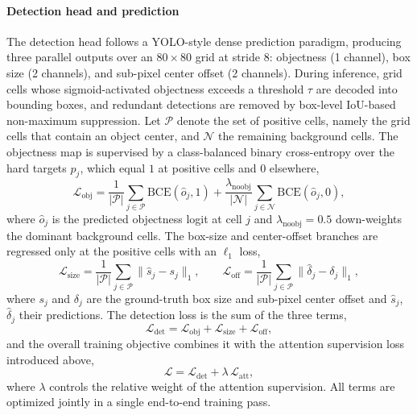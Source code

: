 \documentclass[lettersize,journal]{IEEEtran}
\begin{document}
\paragraph{Detection head and prediction}
The detection head follows a YOLO-style dense prediction paradigm, 
producing three parallel outputs over an $80\times80$ grid at stride 8: 
objectness (1 channel), box size (2 channels), and sub-pixel center offset (2 channels). 
During inference, grid cells whose sigmoid-activated objectness exceeds a threshold $\tau$ are decoded into bounding boxes, 
and redundant detections are removed by box-level IoU-based non-maximum suppression. 
Let $\mathcal{P}$ denote the set of positive cells, namely the grid cells that contain an object center, and $\mathcal{N}$ the remaining background cells.
The objectness map is supervised by a class-balanced binary cross-entropy over the hard targets $p_j$, which equal $1$ at positive cells and $0$ elsewhere,
\begin{equation}
\mathcal{L}_{\mathrm{obj}} = \frac{1}{|\mathcal{P}|}\sum_{j\in\mathcal{P}} \mathrm{BCE}(\hat{o}_j, 1)
+ \frac{\lambda_{\mathrm{noobj}}}{|\mathcal{N}|}\sum_{j\in\mathcal{N}} \mathrm{BCE}(\hat{o}_j, 0),
\end{equation}
where $\hat{o}_j$ is the predicted objectness logit at cell $j$ and $\lambda_{\mathrm{noobj}}=0.5$ down-weights the dominant background cells.
The box-size and center-offset branches are regressed only at the positive cells with an $\ell_1$ loss,
\begin{equation}
\mathcal{L}_{\mathrm{size}} = \frac{1}{|\mathcal{P}|}\sum_{j\in\mathcal{P}} \lVert \hat{s}_j - s_j \rVert_1,
\qquad
\mathcal{L}_{\mathrm{off}} = \frac{1}{|\mathcal{P}|}\sum_{j\in\mathcal{P}} \lVert \hat{\delta}_j - \delta_j \rVert_1,
\end{equation}
where $s_j$ and $\delta_j$ are the ground-truth box size and sub-pixel center offset and $\hat{s}_j$, $\hat{\delta}_j$ their predictions.
The detection loss is the sum of the three terms,
\begin{equation}
\mathcal{L}_{\mathrm{det}} = \mathcal{L}_{\mathrm{obj}} + \mathcal{L}_{\mathrm{size}} + \mathcal{L}_{\mathrm{off}},
\end{equation}
and the overall training objective combines it with the attention supervision loss introduced above,
\begin{equation}
\mathcal{L} = \mathcal{L}_{\mathrm{det}} + \lambda\, \mathcal{L}_{\mathrm{att}},
\end{equation}
where $\lambda$ controls the relative weight of the attention supervision. All terms are optimized jointly in a single end-to-end training pass.
\end{document}
